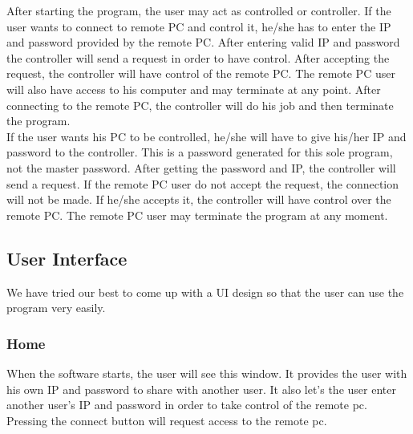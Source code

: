 \documentclass[12pt, a4paper]{article}
\begin{document}
After starting the program, the user may act as controlled or controller. If the user wants to connect to remote PC and control it, he/she has to enter the IP and password provided by the remote PC. After entering valid IP and password the controller will send a request in order to have control. After accepting the request, the controller will have control of the remote PC. The remote PC user will also have access to his computer and may terminate at any point. After connecting to the remote PC, the controller will do his job and then terminate the program. \\
If the user wants his PC to be controlled, he/she will have to give his/her IP and password to the controller. This is a password generated for this sole program, not the master password. After getting the password and IP, the controller will send a request. If the remote PC user do not accept the request, the connection will not be made. If he/she accepts it, the controller will have control over the remote PC. The remote PC user may terminate the program at any moment.

\newpage

\subsection{User Interface}

We have tried our best to come up with a UI design so that the user can use the program very easily.

\subsubsection{Home}
When the software starts, the user will see this window. It provides the user with his own IP and password to share with another user. It also let's the user enter another user's IP and password in order to take control of the remote pc. Pressing the connect button will request access to the remote pc.
\end{document}
